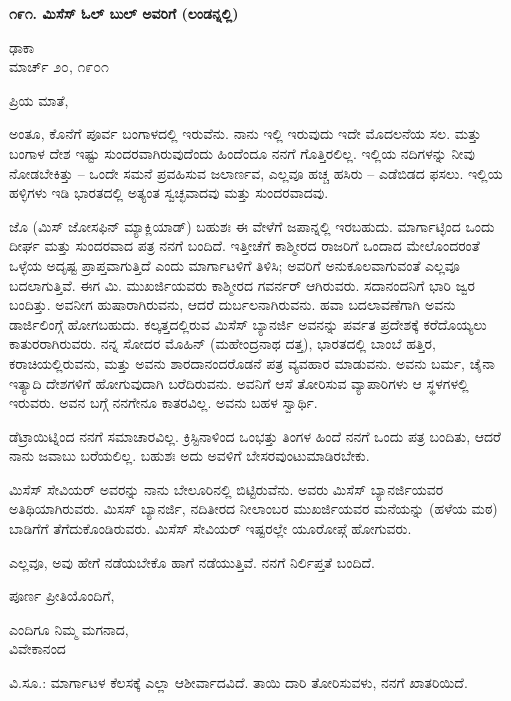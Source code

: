 \begin{center}
\textbf{೧೯೧. ಮಿಸೆಸ್ ಓಲ್ ಬುಲ್ ಅವರಿಗೆ (ಲಂಡನ್ನಲ್ಲಿ)}
\end{center}

\begin{flushright}
ಢಾಕಾ\\ಮಾರ್ಚ್ ೨೦, ೧೯೦೧
\end{flushright}

ಪ್ರಿಯ ಮಾತೆ,

ಅಂತೂ, ಕೊನೆಗೆ ಪೂರ್ವ ಬಂಗಾಳದಲ್ಲಿ ಇರುವೆನು. ನಾನು ಇಲ್ಲಿ ಇರುವುದು ಇದೇ ಮೊದಲನೆಯ ಸಲ. ಮತ್ತು ಬಂಗಾಳ ದೇಶ ಇಷ್ಟು ಸುಂದರವಾಗಿರುವುದೆಂದು ಹಿಂದೆಂದೂ ನನಗೆ ಗೊತ್ತಿರಲಿಲ್ಲ. ಇಲ್ಲಿಯ ನದಿಗಳನ್ನು ನೀವು ನೋಡಬೇಕಿತ್ತು – ಒಂದೇ ಸಮನೆ ಪ್ರವಹಿಸುವ ಜಲಾರ್ಣವ, ಎಲ್ಲವೂ ಹಚ್ಚ ಹಸಿರು – ಎಡೆಬಿಡದ ಫಸಲು. ಇಲ್ಲಿಯ ಹಳ್ಳಿಗಳು ಇಡಿ ಭಾರತದಲ್ಲಿ ಅತ್ಯಂತ ಸ್ವಚ್ಛವಾದವು ಮತ್ತು ಸುಂದರವಾದವು.

ಜೊ (ಮಿಸ್ ಜೋಸಫಿನ್ ಮ್ಯಾಕ್ಲಿಯಾಡ್) ಬಹುಶಃ ಈ ವೇಳೆಗೆ ಜಪಾನ್ನಲ್ಲಿ ಇರಬಹುದು. ಮಾರ್ಗಾಟ್ಳಿಂದ ಒಂದು ದೀರ್ಘ ಮತ್ತು ಸುಂದರವಾದ ಪತ್ರ ನನಗೆ ಬಂದಿದೆ. ಇತ್ತೀಚೆಗೆ ಕಾಶ್ಮೀರದ ರಾಜರಿಗೆ ಒಂದಾದ ಮೇಲೊಂದರಂತೆ ಒಳ್ಳೆಯ ಅದೃಷ್ಟ ಪ್ರಾಪ್ತವಾಗುತ್ತಿದೆ ಎಂದು ಮಾರ್ಗಾಟಳಿಗೆ ತಿಳಿಸಿ; ಅವರಿಗೆ ಅನುಕೂಲವಾಗುವಂತೆ ಎಲ್ಲವೂ ಬದಲಾಗುತ್ತಿವೆ. ಈಗ ಮಿ. ಮುಖರ್ಜಿಯವರು ಕಾಶ್ಮೀರದ ಗವರ್ನರ್ ಆಗಿರುವರು. ಸದಾನಂದನಿಗೆ ಭಾರಿ ಜ್ವರ ಬಂದಿತ್ತು. ಅವನೀಗ ಹುಷಾರಾಗಿರುವನು, ಆದರೆ ದುರ್ಬಲನಾಗಿರುವನು. ಹವಾ ಬದಲಾವಣೆಗಾಗಿ ಅವನು ಡಾರ್ಜಿಲಿಂಗ್ಗೆ ಹೋಗಬಹುದು. ಕಲ್ಕತ್ತದಲ್ಲಿರುವ ಮಿಸೆಸ್ ಬ್ಯಾನರ್ಜಿ ಅವನನ್ನು ಪರ್ವತ ಪ್ರದೇಶಕ್ಕೆ ಕರೆದೊಯ್ಯಲು ಕಾತುರರಾಗಿರುವರು. ನನ್ನ ಸೋದರ ಮೊಹಿನ್ (ಮಹೇಂದ್ರನಾಥ ದತ್ತ), ಭಾರತದಲ್ಲಿ ಬಾಂಬೆ ಹತ್ತಿರ, ಕರಾಚಿಯಲ್ಲಿರುವನು, ಮತ್ತು ಅವನು ಶಾರದಾನಂದರೊಡನೆ ಪತ್ರ ವ್ಯವಹಾರ ಮಾಡುವನು. ಅವನು ಬರ್ಮ, ಚೈನಾ ಇತ್ಯಾದಿ ದೇಶಗಳಿಗೆ ಹೋಗುವುದಾಗಿ ಬರೆದಿರುವನು. ಅವನಿಗೆ ಆಸೆ ತೋರಿಸುವ ವ್ಯಾಪಾರಿಗಳು ಆ ಸ್ಥಳಗಳಲ್ಲಿ ಇರುವರು. ಅವನ ಬಗ್ಗೆ ನನಗೇನೂ ಕಾತರವಿಲ್ಲ. ಅವನು ಬಹಳ ಸ್ವಾರ್ಥಿ.

ಡೆಟ್ರಾಯಿಟ್ನಿಂದ ನನಗೆ ಸಮಾಚಾರವಿಲ್ಲ. ಕ್ರಿಸ್ಟಿನಾಳಿಂದ ಒಂಭತ್ತು ತಿಂಗಳ ಹಿಂದೆ ನನಗೆ ಒಂದು ಪತ್ರ ಬಂದಿತು, ಆದರೆ ನಾನು ಜವಾಬು ಬರೆಯಲಿಲ್ಲ. ಬಹುಶಃ ಅದು ಅವಳಿಗೆ ಬೇಸರವುಂಟುಮಾಡಿರಬೇಕು.

ಮಿಸೆಸ್ ಸೇವಿಯರ್ ಅವರನ್ನು ನಾನು ಬೇಲೂರಿನಲ್ಲಿ ಬಿಟ್ಟಿರುವೆನು. ಅವರು ಮಿಸೆಸ್ ಬ್ಯಾನರ್ಜಿಯವರ ಅತಿಥಿಯಾಗಿರುವರು. ಮಿಸಸ್ ಬ್ಯಾನರ್ಜಿ, ನದಿತೀರದ ನೀಲಾಂಬರ ಮುಖರ್ಜಿಯವರ ಮನೆಯನ್ನು (ಹಳೆಯ ಮಠ) ಬಾಡಿಗೆಗೆ ತೆಗೆದುಕೊಂಡಿರುವರು. ಮಿಸೆಸ್ ಸೇವಿಯರ್ ಇಷ್ಟರಲ್ಲೇ ಯೂರೋಪ್ಗೆ ಹೋಗುವರು.

ಎಲ್ಲವೂ, ಅವು ಹೇಗೆ ನಡೆಯಬೇಕೊ ಹಾಗೆ ನಡೆಯುತ್ತಿವೆ. ನನಗೆ ನಿರ್ಲಿಪ್ತತೆ ಬಂದಿದೆ.

ಪೂರ್ಣ ಪ್ರೀತಿಯೊಂದಿಗೆ,

\begin{flushright}
ಎಂದಿಗೂ ನಿಮ್ಮ ಮಗನಾದ,\\ವಿವೇಕಾನಂದ
\end{flushright}

ವಿ.ಸೂ.: ಮಾರ್ಗಾಟಳ ಕೆಲಸಕ್ಕೆ ಎಲ್ಲಾ ಆಶೀರ್ವಾದವಿದೆ. ತಾಯಿ ದಾರಿ ತೋರಿಸುವಳು, ನನಗೆ ಖಾತರಿಯಿದೆ.

